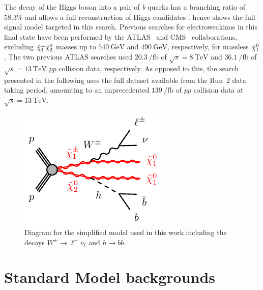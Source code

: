The decay of the Higgs boson into a pair of \textit{b} quarks has a branching ratio of 58.3\% and allows a full reconstruction of Higgs candidates .  hence shows the full signal model targeted in this search. Previous searches for electroweakinos in this final state have been performed by the ATLAS~\cite{SUSY-2013-23,SUSY-2017-01} and CMS~\cite{CMS-SUS-16-043} collaborations, excluding $\tilde{\chi}_1^\pm\tilde{\chi}_2^0$ masses up to $\SI{540}{\GeV}$ and $\SI{490}{\GeV}$, respectively, for massless $\tilde{\chi}_1^0$. The two previous ATLAS searches used $\SI{20.3}{\per\femto\barn}$ of $\sqrt{s}=\SI{8}{\TeV}$ and $\SI{36.1}{\per\femto\barn}$ of $\sqrt{s}=\SI{13}{\TeV}$ $pp$ collision data, respectively. As opposed to this, the search presented in the following uses the full dataset available from the Run~2 data taking period, amounting to an unprecedented $\SI{139}{\per\femto\barn}$ of $pp$ collision data at $\sqrt{s}=\SI{13}{\TeV}$.

\begin{figure}
	\centering\includegraphics[width=.4\textwidth]{model_c1n2_Wh}
	\caption{Diagram for the simplified model used in this work including the decays $W^\pm\rightarrow\ell^\pm\nu_\ell$ and $h\rightarrow b\bar{b}$.}\label{fig:Wh_model_full}
\end{figure}

\section{Standard Model backgrounds}

